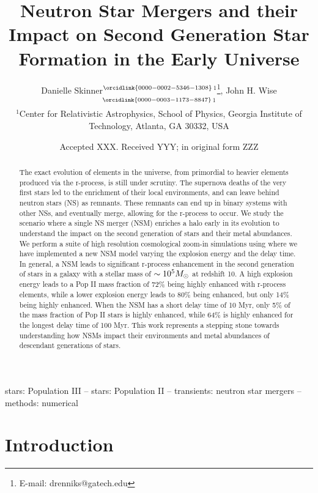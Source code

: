 \documentclass[fleqn,usenatbib]{mnras}
\title[Neutron Star Mergers from Population III Stars]{Neutron Star Mergers and their Impact on Second Generation Star Formation in the Early Universe}
\author[Skinner \& Wise]{
Danielle Skinner$^{\orcidlink{0000-0002-5346-1308}}$$^{1}$\thanks{E-mail: drenniks@gatech.edu},
John H. Wise$^{\orcidlink{0000-0003-1173-8847}}$$^{1}$
\\
$^{1}$Center for Relativistic Astrophysics, School of Physics, Georgia Institute of Technology, Atlanta, GA 30332, USA\\
}
\date{Accepted XXX. Received YYY; in original form ZZZ}
\begin{document}
\label{firstpage}
\pagerange{\pageref{firstpage}--\pageref{lastpage}}
\maketitle

\begin{abstract}
	The exact evolution of elements in the universe, from primordial to heavier elements produced via the r-process, is still under scrutiny. The supernova deaths of the very first stars led to the enrichment of their local environments, and can leave behind neutron stars (NS) as remnants. These remnants can end up in binary systems with other NSs, and eventually merge, allowing for the r-process to occur. We study the scenario where a single NS merger (NSM) enriches a halo early in its evolution to understand the impact on the second generation of stars and their metal abundances. We perform a suite of high resolution cosmological zoom-in simulations using \enzo{} where we have implemented a new NSM model varying the explosion energy and the delay time. In general, a NSM leads to significant r-process enhancement in the second generation of stars in a galaxy with a stellar mass of $\sim 10^5 \Ms$ at redshift 10.  A high explosion energy leads to a Pop II mass fraction of 72\% being highly enhanced with r-process elements, while a lower explosion energy leads to 80\% being enhanced, but only 14\% being highly enhanced. When the NSM has a short delay time of 10 Myr, only 5\% of the mass fraction of Pop II stars is highly enhanced, while 64\% is highly enhanced for the longest delay time of 100 Myr. This work represents a stepping stone towards understanding how NSMs impact their environments and metal abundances of descendant generations of stars.
\end{abstract}

\begin{keywords}
stars: Population III -- stars: Population II -- transients: neutron star mergers -- methods: numerical
\end{keywords}



\section{Introduction}
\end{document}
